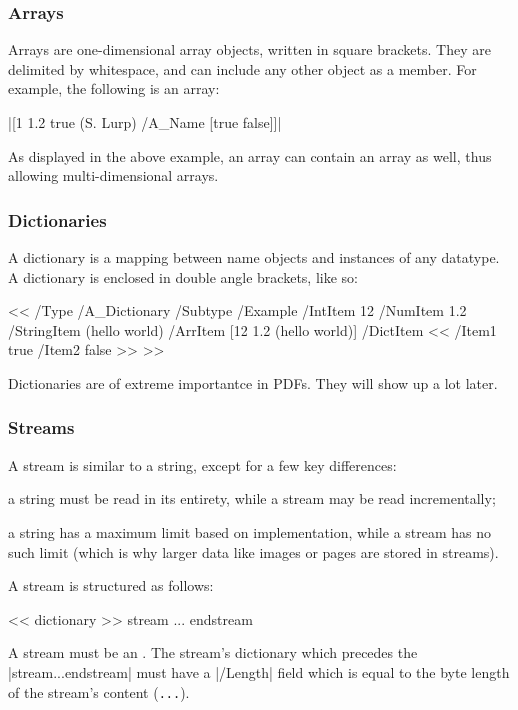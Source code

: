 \subsubsection{Arrays}

Arrays are one-dimensional array objects, written in square brackets.
They are delimited by whitespace, and can include any other object as a member.
For example, the following is an array:

\centerline{\inlinecode|[1 1.2 true (S. Lurp) /A_Name [true false]]|}
As displayed in the above example, an array can contain an array as well, thus allowing multi-dimensional
arrays.

\subsubsection{Dictionaries}

A dictionary is a mapping between name objects and instances of any datatype.
A dictionary is enclosed in double angle brackets, like so:

\blisting
<<
    /Type /A_Dictionary
    /Subtype /Example
    /IntItem 12
    /NumItem 1.2
    /StringItem (hello world)
    /ArrItem [12 1.2 (hello world)]
    /DictItem <<
        /Item1 true
        /Item2 false
    >>
>>
\elisting

Dictionaries are of extreme importantce in PDFs.
They will show up a lot later.

\subsubsection{Streams}

A stream is similar to a string, except for a few key differences:
\benum
    \item a string must be read in its entirety, while a stream may be read incrementally;
    \item a string has a maximum limit based on implementation, while a stream has no such limit (which is
        why larger data like images or pages are stored in streams).
\eenum

A stream is structured as follows:

\blisting
<< dictionary >>
stream
...
endstream
\elisting

A stream must be an .
The stream's dictionary which precedes the \inlinecode|stream...endstream| must have a \inlinecode|/Length|
field which is equal to the byte length of the stream's content ({\tt...}).

